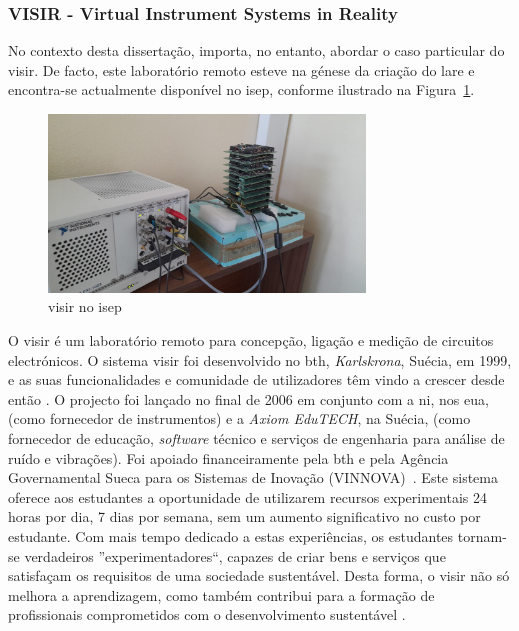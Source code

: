 \subsubsection{VISIR - Virtual Instrument Systems in Reality}
\label{sec:visir}
No contexto desta dissertação, importa, no entanto, abordar o caso particular do \acrshort{visir}. De facto, este laboratório remoto esteve na génese da criação do \acrshort{lare} e encontra-se actualmente disponível no \acrshort{isep}, conforme ilustrado na Figura~\ref{fig:visirISEP}.
\begin{figure}[hbtp]
    \centering
    \includegraphics[width=0.75\textwidth]{figures/visirISEP.jpeg}
    \caption{\acrshort{visir} no \acrshort{isep}}
    \label{fig:visirISEP}
\end{figure}

O \acrshort{visir} é um laboratório remoto para concepção, ligação e medição de circuitos electrónicos. O sistema \acrshort{visir} foi desenvolvido no \acrfull{bth}, \textit{Karlskrona}, Suécia, em 1999, e as suas funcionalidades e comunidade de utilizadores têm vindo a crescer desde então \cite{RemoteLabsImpactVISIR}. O projecto foi lançado no final de 2006 em conjunto com a \acrshort{ni}, nos \acrshort{eua}, (como fornecedor de instrumentos) e a \textit{Axiom EduTECH}, na Suécia, (como fornecedor de educação, \textit{software} técnico e serviços de engenharia para análise de ruído e vibrações). Foi apoiado financeiramente pela \acrshort{bth} e pela Agência Governamental Sueca para os Sistemas de Inovação (VINNOVA)~\cite{VISIRExperiencesChallenges}. Este sistema oferece aos estudantes a oportunidade de utilizarem recursos experimentais 24 horas por dia, 7 dias por semana, sem um aumento significativo no custo por estudante. Com mais tempo dedicado a estas experiências, os estudantes tornam-se verdadeiros ''experimentadores``, capazes de criar bens e serviços que satisfaçam os requisitos de uma sociedade sustentável. Desta forma, o \acrshort{visir} não só melhora a aprendizagem, como também contribui para a formação de profissionais comprometidos com o desenvolvimento sustentável \cite{OpenLabs77:online}.

